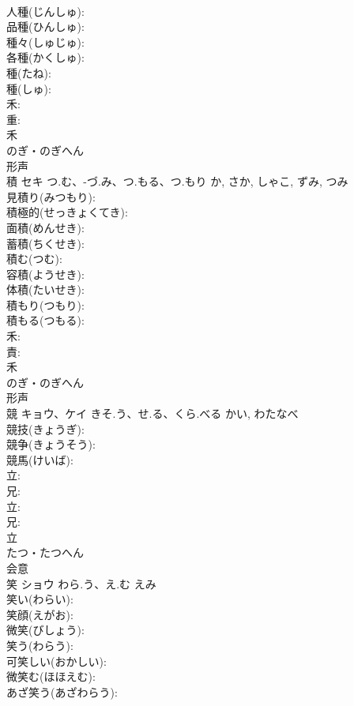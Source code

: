 \documentclass[8pt]{extreport}
\begin{document}
\begin{CJK}{UTF8}{min}
\\	人種(じんしゅ): 
\\	品種(ひんしゅ): 
\\	種々(しゅじゅ): 
\\	各種(かくしゅ): 
\\	種(たね): 
\\	種(しゅ): 
\\	禾: 
\\	重: 
\\	禾	
\\	のぎ・のぎへん	
\\	形声 
\\	積	セキ	つ.む、-づ.み、つ.もる、つ.もり	か, さか, しゃこ, ずみ, つみ	
\\	見積り(みつもり): 
\\	積極的(せっきょくてき): 
\\	面積(めんせき): 
\\	蓄積(ちくせき): 
\\	積む(つむ): 
\\	容積(ようせき): 
\\	体積(たいせき): 
\\	積もり(つもり): 
\\	積もる(つもる): 
\\	禾: 
\\	責: 
\\	禾	
\\	のぎ・のぎへん	
\\	形声 
\\	競	キョウ、ケイ	きそ.う、せ.る、くら.べる	かい, わたなべ	
\\	競技(きょうぎ): 
\\	競争(きょうそう): 
\\	競馬(けいば): 
\\	立: 
\\	兄: 
\\	立: 
\\	兄: 
\\	立	
\\	たつ・たつへん	
\\	会意 
\\	笑	ショウ	わら.う、え.む	えみ	
\\	笑い(わらい): 
\\	笑顔(えがお): 
\\	微笑(びしょう): 
\\	笑う(わらう): 
\\	可笑しい(おかしい): 
\\	微笑む(ほほえむ): 
\\	あざ笑う(あざわらう): 

\end{CJK}
\end{document}
